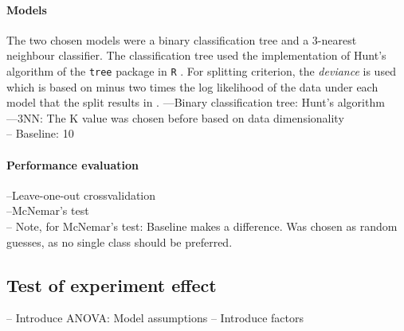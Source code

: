 \documentclass[12pt,fleqn]{article}
\begin{document}
\paragraph{Models} The two chosen models were a binary classification tree and a 3-nearest neighbour classifier. The classification tree used the implementation of Hunt's algorithm of the \texttt{tree} package in \texttt{R} \cite{Tree}. For splitting criterion, the \textit{deviance} is used which is based on minus two times the log likelihood of the data under each model that the split results in \cite{Deviance}.
---Binary classification tree: Hunt's algorithm\\
---3NN: The K value was chosen before based on data dimensionality\\
-- Baseline: 10\pro\\  

\paragraph{Performance evaluation}
--Leave-one-out crossvalidation\\
--McNemar's test\\
-- Note, for McNemar's test: Baseline makes a difference. Was chosen as random guesses, as no single class should be preferred.
\subsection{Test of experiment effect}

-- Introduce ANOVA: Model assumptions
-- Introduce factors
\end{document}
